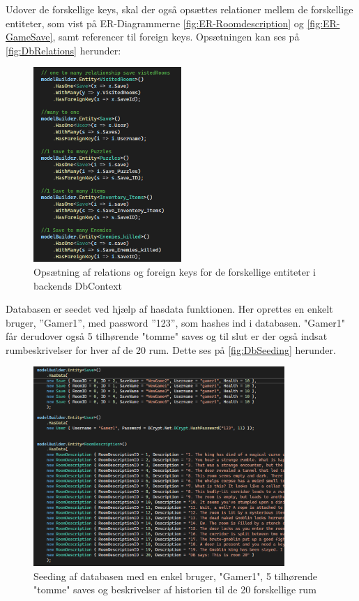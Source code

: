 \noindent Udover de forskellige keys, skal der også opsættes relationer mellem de forskellige entiteter, som vist på ER-Diagrammerne \autoref{fig:ER-Roomdescription} og \autoref{fig:ER-GameSave}, samt referencer til foreign keys. 
Opsætningen kan ses på \autoref{fig:DbRelations} herunder: 

\begin{figure}[H]
\centering
\includegraphics[width = 0.5\textwidth]{02-Body/Images/DAL-Database/DbRelations.PNG}
\caption{Opsætning af relations og foreign keys for de forskellige entiteter i backends DbContext}
\label{fig:DbRelations}
\end{figure}

\noindent Databasen er seedet ved hjælp af hasdata funktionen. Her oprettes en enkelt bruger, ”Gamer1”, med password ”123”, som hashes ind i databasen. "Gamer1" får derudover også 5 tilhørende "tomme" saves og til slut er der også indsat rumbeskrivelser for hver af de 20 rum. Dette ses på \autoref{fig:DbSeeding} herunder.

\begin{figure}[H]
\centering
\includegraphics[width = 0.85\textwidth]{02-Body/Images/DAL-Database/DbSeeding.PNG}
\caption{Seeding af databasen med en enkel bruger, "Gamer1", 5 tilhørende "tomme" saves og beskrivelser af historien til de 20 forskellige rum}
\label{fig:DbSeeding}
\end{figure}